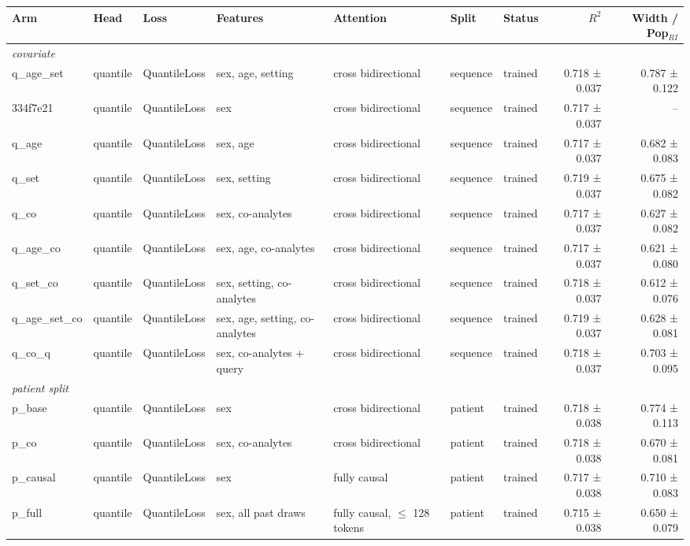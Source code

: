 \begin{table}[ht]
\centering
\scriptsize
\setlength{\tabcolsep}{4pt}
\begin{tabular}{ll p{3.0cm} p{3.2cm} p{2.6cm} l p{1.9cm} rr}
\toprule
Arm & Head & Loss & Features & Attention & Split & Status & $R^2$ & Width / Pop$_{RI}$ \\
\midrule
\multicolumn{9}{l}{\emph{covariate}} \\
q\_age\_set & quantile & QuantileLoss & sex, age, setting & cross bidirectional & sequence & trained & 0.718 ± 0.037 & 0.787 ± 0.122 \\
334f7e21 & quantile & QuantileLoss & sex & cross bidirectional & sequence & trained & 0.717 ± 0.037 & -- \\
q\_age & quantile & QuantileLoss & sex, age & cross bidirectional & sequence & trained & 0.717 ± 0.037 & 0.682 ± 0.083 \\
q\_set & quantile & QuantileLoss & sex, setting & cross bidirectional & sequence & trained & 0.719 ± 0.037 & 0.675 ± 0.082 \\
q\_co & quantile & QuantileLoss & sex, co-analytes & cross bidirectional & sequence & trained & 0.717 ± 0.037 & 0.627 ± 0.082 \\
q\_age\_co & quantile & QuantileLoss & sex, age, co-analytes & cross bidirectional & sequence & trained & 0.717 ± 0.037 & 0.621 ± 0.080 \\
q\_set\_co & quantile & QuantileLoss & sex, setting, co-analytes & cross bidirectional & sequence & trained & 0.718 ± 0.037 & 0.612 ± 0.076 \\
q\_age\_set\_co & quantile & QuantileLoss & sex, age, setting, co-analytes & cross bidirectional & sequence & trained & 0.719 ± 0.037 & 0.628 ± 0.081 \\
q\_co\_q & quantile & QuantileLoss & sex, co-analytes + query & cross bidirectional & sequence & trained & 0.718 ± 0.037 & 0.703 ± 0.095 \\
\midrule
\multicolumn{9}{l}{\emph{patient split}} \\
p\_base & quantile & QuantileLoss & sex & cross bidirectional & patient & trained & 0.718 ± 0.038 & 0.774 ± 0.113 \\
p\_co & quantile & QuantileLoss & sex, co-analytes & cross bidirectional & patient & trained & 0.718 ± 0.038 & 0.670 ± 0.081 \\
p\_causal & quantile & QuantileLoss & sex & fully causal & patient & trained & 0.717 ± 0.038 & 0.710 ± 0.083 \\
p\_full & quantile & QuantileLoss & sex, all past draws & fully causal, $\leq$ 128 tokens & patient & trained & 0.715 ± 0.038 & 0.650 ± 0.079 \\

\end{tabular}
\end{table}
